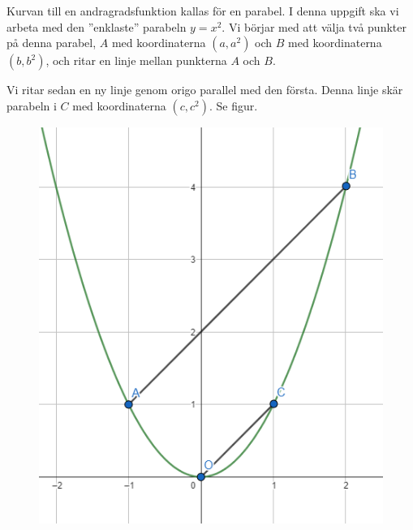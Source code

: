 
Kurvan till en andragradsfunktion kallas för en parabel. I denna uppgift ska vi arbeta med
den ''enklaste'' parabeln $y=x^2$. Vi börjar med att välja två punkter på denna parabel,
$A$ med koordinaterna $(a,a^2)$ och $B$ med koordinaterna $(b,b^2)$, och ritar en linje mellan punkterna $A$ och $B$.

Vi ritar sedan en ny linje genom origo parallel med den första. Denna linje skär parabeln i $C$ med koordinaterna $(c,c^2)$.
Se figur.
\begin{figure}[H]
    \centering
    \includegraphics[width=0.3\linewidth]{img/parabella.png}
    \caption{}
\end{figure}

